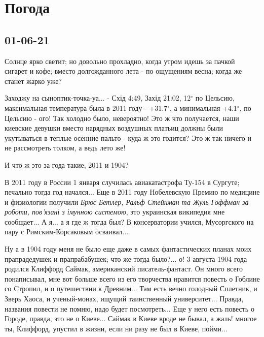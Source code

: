  
 
 
 
 
\chapter{Погода}

\section{01-06-21}

Солнце ярко светит; но довольно прохладно, когда утром идешь за пачкой сигарет
и кофе; вместо долгожданного лета - по ощущениям весна; когда же станет жарко
уже?

Заходжу на сыноптик-точка-уа... - Схід 4:49, Захід 21:02, 12$^{\circ}$ по
Цельсию, максимальная температура была в 2011 году - +31.7$^{\circ}$, а
минимальная +4.1$^{\circ}$, по Цельсию - ого! Так холодно было, невероятно! Это
ж что получается, наши киевские девушки вместо нарядных воздушных платьиц
должны были укутываться в теплые осенние пальто - куда ж это годится? Это ж так
ничего и не рассмотреть толком, а ведь лето же!

И что ж это за года такие, 2011 и 1904? 

В 2011 году в России 1 января случилась авиакатастрофа Ту-154 в Сургуте;
печально тогда год начался...  Еще в 2011 году Нобелевскую Премию по медицине и
физиологии получили \emph{Брюс Бетлер, Ральф Стейнман та Жуль Гоффман за
роботи, пов'язані з імунною системою}, это украинская википедия мне сообщает...
А я... а я где ж тогда был? В консерватории учился, Мусоргского на пару с
Римским-Корсаковым осваивал...

Ну а в 1904 году меня не было еще даже в самых фантастических планах моих
прапрадедушек и прапрабабушек; что же тогда было?... о! 3 августа 1904 года
родился Клиффорд Саймак, американский писатель-фантаст. Он много всего
понаписывал, мне вот больше всего из его творчества нравится повесть о Гоблине
со Cтропил, и о путешествии к Древним... Там есть вечно голодный Сплетник, и
Зверь Хаоса, и ученый-монах, ищущий таинственный университет... Правда,
названия повести не помню, надо будет посмотреть...  Еще у него есть повесть о
Городе, правда, это не о Киеве... Саймак в Киеве вроде не бывал, а жаль! многое
ты, Клиффорд, упустил в жизни, если ни разу не был в Киеве, пойми...

